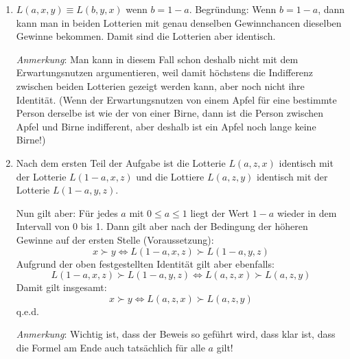 \begin{enumerate}

\item $L(a,x,y) \equiv L(b,y,x)$ wenn $b = 1-a$. Begründung: Wenn
  $b=1-a$, dann kann man in beiden Lotterien mit genau denselben
  Gewinnchancen dieselben Gewinne bekommen. Damit sind die Lotterien
  aber identisch. 

  \begin{small}
  {\em Anmerkung}: Man kann in diesem Fall schon deshalb nicht mit dem
  Erwartungsnutzen argumentieren, weil damit höchstens die Indifferenz 
  zwischen beiden Lotterien gezeigt werden kann, aber noch nicht ihre Identität.
  (Wenn der Erwartungsnutzen von einem Apfel für eine bestimmte Person
  derselbe ist wie der von einer Birne, dann ist die Person zwischen Apfel und
  Birne indifferent, aber deshalb ist ein Apfel noch lange keine Birne!)
  \end{small}

\item Nach dem ersten Teil der Aufgabe ist die Lotterie $L(a, z, x)$ identisch
mit der Lotterie $L(1-a, x, z)$ und die Lottiere $L(a, z, y)$ identisch mit der
      Lotterie $L(1-a, y, z)$.

      Nun gilt aber: Für jedes $a$ mit $0 \leq a \leq 1$ liegt der Wert
      $1-a$ wieder in dem Intervall von 0 bis 1. Dann gilt aber nach der Bedingung der
      höheren Gewinne auf der ersten Stelle (Voraussetzung):
      \[x \succ y \Leftrightarrow L(1-a, x, z) \succ L(1-a, y, z)\]
      Aufgrund der oben festgestellten Identität gilt aber ebenfalls:
      \[L(1-a, x, z) \succ L(1-a, y, z) \Leftrightarrow
        L(a, z, x) \succ L(a, z, y)\]
      Damit gilt insgesamt:
      \[x \succ y \Leftrightarrow L(a, z, x) \succ L(a, z, y) \]      
      q.e.d.
      
      \begin{small}
      {\em Anmerkung}: Wichtig ist, dass der Beweis so geführt wird, dass klar
      ist, dass die Formel am Ende auch tatsächlich für alle $a$ gilt!
      \end{small}
\end{enumerate}
